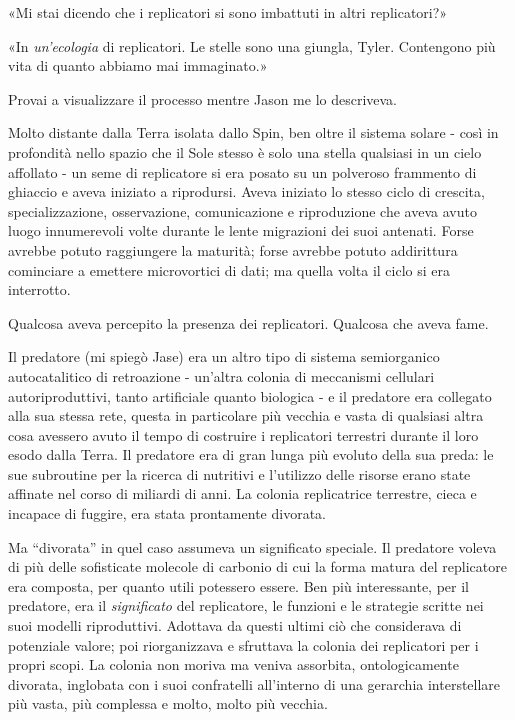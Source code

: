 «Mi stai dicendo che i replicatori si sono imbattuti in altri
replicatori?»

«In \emph{un'ecologia} di replicatori. Le stelle sono una giungla,
Tyler. Contengono più vita di quanto abbiamo mai immaginato.»

Provai a visualizzare il processo mentre Jason me lo descriveva.

Molto distante dalla Terra isolata dallo Spin, ben oltre il sistema
solare - così in profondità nello spazio che il Sole stesso è solo una
stella qualsiasi in un cielo affollato - un seme di replicatore si era
posato su un polveroso frammento di ghiaccio e aveva iniziato a
riprodursi. Aveva iniziato lo stesso ciclo di crescita,
specializzazione, osservazione, comunicazione e riproduzione che aveva
avuto luogo innumerevoli volte durante le lente migrazioni dei suoi
antenati. Forse avrebbe potuto raggiungere la maturità; forse avrebbe
potuto addirittura cominciare a emettere microvortici di dati; ma quella
volta il ciclo si era interrotto.

Qualcosa aveva percepito la presenza dei replicatori. Qualcosa che aveva
fame.

Il predatore (mi spiegò Jase) era un altro tipo di sistema semiorganico
autocatalitico di retroazione - un'altra colonia di meccanismi cellulari
autoriproduttivi, tanto artificiale quanto biologica - e il predatore
era collegato alla sua stessa rete, questa in particolare più vecchia e
vasta di qualsiasi altra cosa avessero avuto il tempo di costruire i
replicatori terrestri durante il loro esodo dalla Terra. Il predatore
era di gran lunga più evoluto della sua preda: le sue subroutine per la
ricerca di nutritivi e l'utilizzo delle risorse erano state affinate nel
corso di miliardi di anni. La colonia replicatrice terrestre, cieca e
incapace di fuggire, era stata prontamente divorata.

Ma ``divorata'' in quel caso assumeva un significato speciale. Il
predatore voleva di più delle sofisticate molecole di carbonio di cui la
forma matura del replicatore era composta, per quanto utili potessero
essere. Ben più interessante, per il predatore, era il
\emph{significato} del replicatore, le funzioni e le strategie scritte
nei suoi modelli riproduttivi. Adottava da questi ultimi ciò che
considerava di potenziale valore; poi riorganizzava e sfruttava la
colonia dei replicatori per i propri scopi. La colonia non moriva ma
veniva assorbita, ontologicamente divorata, inglobata con i suoi
confratelli all'interno di una gerarchia interstellare più vasta, più
complessa e molto, molto più vecchia.

